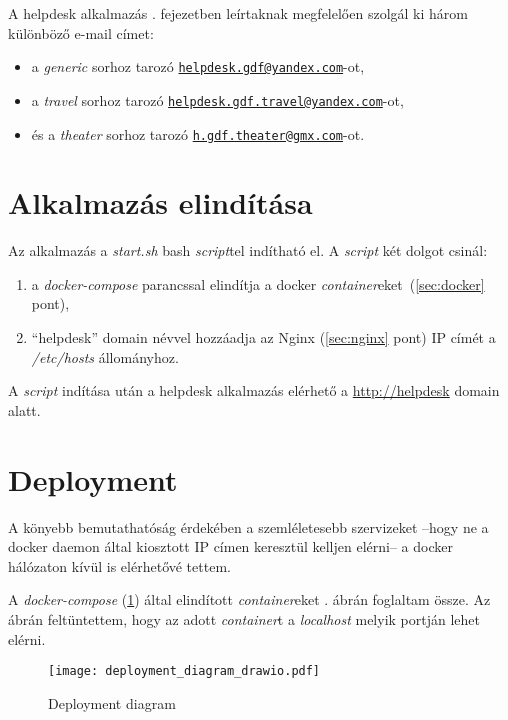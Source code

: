 A helpdesk alkalmazás . fejezetben leírtaknak megfelelően szolgál ki három különböző e-mail címet:

\begin{itemize}
	\item a \textit{generic} sorhoz tarozó  \href{mailto:helpdesk.gdf@yandex.com}{\nolinkurl{helpdesk.gdf@yandex.com}}-ot, 
	\item a \textit{travel} sorhoz tarozó  \href{mailto:helpdesk.gdf.travel@yandex.com}{\nolinkurl{helpdesk.gdf.travel@yandex.com}}-ot,
	\item és a \textit{theater} sorhoz tarozó  \href{mailto:h.gdf.theater@gmx.com}{\nolinkurl{h.gdf.theater@gmx.com}}-ot.
\end{itemize}



\section{Alkalmazás elindítása}\label{sec:elinditas}
Az alkalmazás a \textit{start.sh} bash \textit{script}tel indítható el. A \textit{script} két dolgot csinál:
\begin{enumerate}
	\item a \textit{docker-compose} parancssal elindítja a docker \textit{container}eket~(\ref{sec:docker} pont),
	\item  ``helpdesk'' domain névvel hozzáadja az Nginx (\ref{sec:nginx} pont) IP címét a \mbox{\textit{/etc/hosts}} állományhoz.
\end{enumerate}

A \textit{script} indítása után a helpdesk alkalmazás elérhető a  \href{http://helpdesk}{http://helpdesk} domain alatt.


\section{Deployment}
A könyebb bemutathatóság érdekében a szemléletesebb szervizeket --hogy ne a docker daemon által kiosztott IP címen keresztül kelljen elérni-- a docker hálózaton kívül is elérhetővé tettem. 

A \textit{docker-compose} (\ref{sec:elinditas}) által elindított \textit{container}eket . ábrán foglaltam össze. Az ábrán feltüntettem, hogy az adott \textit{container}t a \textit{localhost} melyik portján lehet elérni.


\begin{figure}[hbt] 
	\centering
	\texttt{[image: deployment\_diagram\_drawio.pdf]}
	\caption[Deployment diagram]{Deployment diagram}
	\label{fig:deployment_diagram}
\end{figure}



